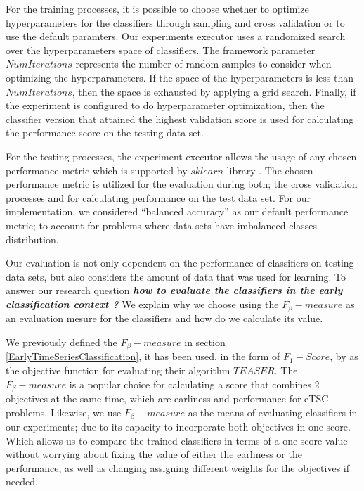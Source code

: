 For the training processes, it is possible to choose whether to optimize hyperparameters for the classifiers through sampling and cross validation or to use the default paramters.
Our experiments executor uses a randomized search over the hyperparameters space of classifiers.
The framework parameter $NumIterations$ represents the number of random samples to consider when optimizing the hyperparameters.
If the space of the hyperparameters is less than $NumIterations$, then the space is exhausted by applying a grid search.
Finally, if the experiment is configured to do hyperparameter optimization,
then the classifier version that attained the highest validation score is used for calculating the performance score on the testing data set.

For the testing processes, the experiment executor allows the usage of any chosen performance metric which is supported by $sklearn$ library \cite{scikit-learn}.
The chosen performance metric is utilized for the evaluation during both; the cross validation processes and for calculating performance on the test data set.
For our implementation, we considered \enquote{balanced accuracy} as our default performance metric; to account for problems where data sets have imbalanced classes distribution.

Our evaluation is not only dependent on the performance of classifiers on testing data sets, but also considers the amount of data that was used for learning.
To answer our research question \textbf{\textit{how to evaluate the classifiers in the early classification context ?}}
We explain why we choose using the $F_{\beta}-measure$ as an evaluation mesure for the classifiers and how do we calculate its value.

We previously defined the $F_{\beta}-measure$ in section \ref{EarlyTimeSeriesClassification}, it has been used, in the form of $F_{1}-Score$, by \cite{schafer2020teaser} as the objective function for evaluating their algorithm $TEASER$.
The $F_{\beta}-measure$ is a popular choice for calculating a score that combines 2 objectives at the same time, which are earliness and performance for eTSC problems.
Likewise, we use $F_{\beta}-measure$ as the means of evaluating classifiers in our experiments; due to its capacity to incorporate both objectives in one score.
Which allows us to compare the trained classifiers in terms of a one score value without worrying about fixing the value of either the earliness or the performance,
as well as changing assigning different weights for the objectives if needed.

